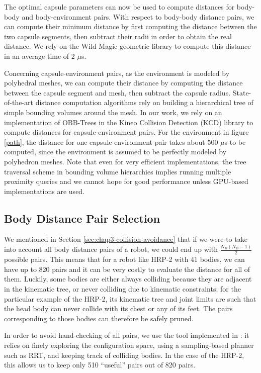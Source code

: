 The optimal capsule parameters can now be used to compute distances
for body-body and body-environment pairs. With respect to body-body
distance pairs, we can compute their minimum distance by first
computing the distance between the two capsule segments, then subtract
their radii in order to obtain the real distance. We rely on the Wild
Magic geometric library \cite{schneider2003geometric, wildmagic} to
compute this distance in an average time of 2 $\mu$s.

Concerning capsule-environment pairs, as the environment is modeled by
polyhedral meshes, we can compute their distance by computing the
distance between the capsule segment and mesh, then subtract the
capsule radius. State-of-the-art distance computation algorithms rely
on building a hierarchical tree of simple bounding volumes around the
mesh. In our work, we rely on an implementation of OBB-Trees in the
Kineo Collision Detection (KCD) library to compute distances for
capsule-environment pairs. For the environment in figure \ref{path},
the distance for one capsule-environment pair takes about 500 $\mu$s
to be computed, since the environment is assumed to be perfectly
modeled by polyhedron meshes. Note that even for very efficient
implementations, the tree traversal scheme in bounding volume
hierarchies implies running multiple proximity queries and we cannot
hope for good performance unless GPU-based implementations are used.

\subsection{Body Distance Pair Selection}

We mentioned in Section \ref{sec:chap3-collision-avoidance} that if we
were to take into account all body distance pairs of a robot, we could
end up with $\frac{N_B(N_B - 1)}{2}$ possible pairs. This means that
for a robot like HRP-2 with 41 bodies, we can have up to 820 pairs and
it can be very costly to evaluate the distance for all of
them. Luckily, some bodies are either always colliding because they
are adjacent in the kinematic tree, or never colliding due to
kinematic constraints; for the particular example of the HRP-2, its
kinematic tree and joint limits are such that the head body can never
collide with its chest or any of its feet. The pairs corresponding to
those bodies can therefore be safely pruned.

In order to avoid hand-checking of all pairs, we use the tool
implemented in \cite{planning-environment}: it relies on finely
exploring the configuration space, using a sampling-based planner such
as RRT, and keeping track of colliding bodies. In the case of the
HRP-2, this allows us to keep only 510 ``useful'' pairs out of 820
pairs.

